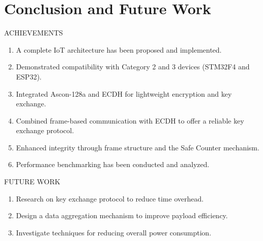 \section{Conclusion and Future Work}
\begin{frame}{ACHIEVEMENTS}
\begin{enumerate}
	\item A complete IoT architecture has been proposed and implemented.
	\item Demonstrated compatibility with Category 2 and 3 devices (STM32F4 and ESP32).
	\item Integrated Ascon-128a and ECDH for lightweight encryption and key exchange.
	\item Combined frame-based communication with ECDH to offer a reliable key exchange protocol.
	\item Enhanced integrity through frame structure and the Safe Counter mechanism.
	\item Performance benchmarking has been conducted and analyzed.
\end{enumerate}
\end{frame}


\begin{frame}{FUTURE WORK}
\begin{enumerate}
	\item Research on key exchange protocol to reduce time overhead.
	\item Design a data aggregation mechanism to improve payload efficiency.
	\item Investigate techniques for reducing overall power consumption.
\end{enumerate}
\end{frame}